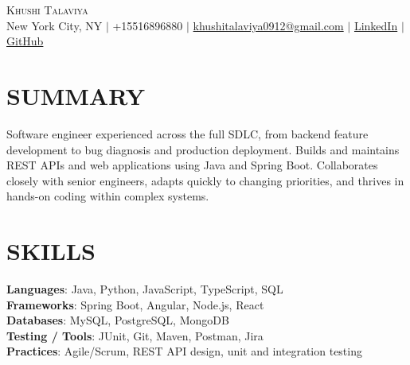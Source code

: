\documentclass[letterpaper,11pt]{article}
\begin{document}
\begin{center}
    {\Huge \scshape Khushi Talaviya} \\ \vspace{2pt}
    \vspace{4pt}
    \small
    New York City, NY $|$
    \small
    +15516896880 $|$
    \href{mailto:khushitalaviya0912@gmail.com}{khushitalaviya0912@gmail.com} $|$
    \href{https://www.linkedin.com/in/khushitalaviya/}{LinkedIn} $|$
    \href{https://github.com/talaviyakhushi}{GitHub}
\end{center}

\section{SUMMARY}
\vspace{5pt}
\small{Software engineer experienced across the full SDLC, from backend feature development to bug diagnosis and production deployment. Builds and maintains REST APIs and web applications using Java and Spring Boot. Collaborates closely with senior engineers, adapts quickly to changing priorities, and thrives in hands-on coding within complex systems.}

\vspace{2pt}
\section{SKILLS}
\vspace{5pt}
\begin{itemize}[leftmargin=0in, label={}]
\small{\item{
\textbf{Languages}{: Java, Python, JavaScript, TypeScript, SQL} \\
\textbf{Frameworks}{: Spring Boot, Angular, Node.js, React} \\
\textbf{Databases}{: MySQL, PostgreSQL, MongoDB} \\
\textbf{Testing / Tools}{: JUnit, Git, Maven, Postman, Jira} \\
\textbf{Practices}{: Agile/Scrum, REST API design, unit and integration testing}
}}
\end{itemize}
\vspace{-10pt}

\end{document}
